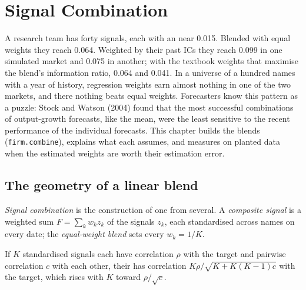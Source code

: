 \chapter{Signal Combination}\label{ch:rs:signal-combination}

A research team has forty signals, each with an  near 0.015. Blended with equal weights they reach 0.064.
Weighted by their past ICs they reach 0.099 in one simulated market and 0.075 in another; with the textbook weights that maximise the
blend's information ratio, 0.064 and 0.041. In a universe of a hundred names with a year of history, regression weights earn almost nothing in one of the two
markets, and there nothing beats equal weights. Forecasters know this pattern as a puzzle: Stock and Watson (2004) found that the most
successful combinations of output-growth forecasts, like the mean, were the least sensitive to the recent performance of the individual
forecasts. This chapter builds the blends (\texttt{firm.combine}), explains what each assumes, and measures on planted data when the
estimated weights are worth their estimation error.

\section{The geometry of a linear blend}

\begin{definition}\label{def:rs:signal-combination:blend}
\emph{Signal combination} is the construction of one  from several. A \emph{composite
signal} is a weighted sum $F = \sum_k w_k z_k$ of the signals $z_k$, each standardised across names on every date;
the \emph{equal-weight blend} sets every $w_k = 1/K$.
\end{definition}

\begin{proposition}\label{prop:rs:signal-combination:geometry}
If $K$ standardised signals each have correlation $\rho$ with the target and pairwise correlation $c$ with each other, their 
has correlation $K\rho/\sqrt{K + K(K - 1)c}$ with the target, which rises with $K$ toward $\rho/\sqrt c$.
\end{proposition}

